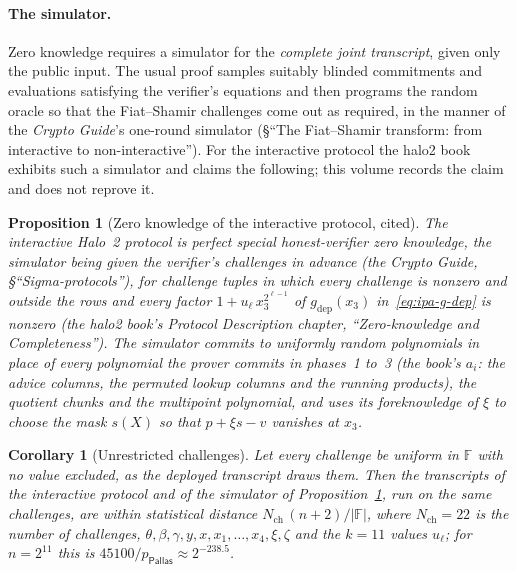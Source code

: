 \documentclass[11pt,a4paper]{article}
\newtheorem{proposition}[theorem]{Proposition}
\newtheorem{corollary}[theorem]{Corollary}
\theoremstyle{definition}
\newcommand{\F}{\mathbb{F}}
\newcommand{\Pallas}{\ensuremath{\mathsf{Pallas}}}
\begin{document}
\paragraph{The simulator.}
Zero knowledge requires a simulator for the \emph{complete joint
transcript}, given only the public input. The usual proof samples
suitably blinded commitments and evaluations satisfying the verifier's
equations and then programs the random oracle so that the Fiat--Shamir
challenges come out as required, in the manner of the \emph{Crypto
Guide}'s one-round simulator (\S``The Fiat--Shamir transform: from
interactive to non-interactive''). For the interactive protocol the
halo2 book exhibits such a simulator and claims the following; this
volume records the claim and does not reprove it.

\begin{proposition}[Zero knowledge of the interactive protocol, cited]
\label{prop:halo2-zk}
The interactive Halo~2 protocol is perfect special honest-verifier zero
knowledge, the simulator being given the verifier's challenges in
advance (the \emph{Crypto Guide}, \S``Sigma-protocols''), for challenge
tuples in which every challenge is nonzero and outside the rows and
every factor $1 + u_\ell\,x_3^{2^{\ell-1}}$ of $g_{\mathrm{dep}}(x_3)$
in~\eqref{eq:ipa-g-dep} is nonzero (the halo2 book's \emph{Protocol
Description} chapter, ``Zero-knowledge and Completeness''). The simulator
commits to uniformly random polynomials in place of every polynomial the
prover commits in phases~1 to~3 (the book's $a_i$: the advice columns,
the permuted lookup columns and the running products), the quotient
chunks and the multipoint polynomial, and uses its foreknowledge
of $\xi$ to choose the mask $s(X)$ so that $p + \xi s - v$ vanishes at
$x_3$.
\end{proposition}

\begin{corollary}[Unrestricted challenges]\label{cor:halo2-zk-deployed}
Let every challenge be uniform in $\F$ with no value excluded, as the
deployed transcript draws them. Then the transcripts of the interactive
protocol and of the simulator of Proposition~\ref{prop:halo2-zk}, run on
the same challenges, are within statistical distance
$N_{\mathrm{ch}}\,(n + 2)/|\F|$, where $N_{\mathrm{ch}} = 22$ is the
number of challenges, $\theta, \beta, \gamma, y, x, x_1, \dots, x_4,
\xi, \zeta$ and the $k = 11$ values $u_\ell$; for $n = 2^{11}$ this is
$45100/p_{\Pallas} \approx 2^{-238.5}$.
\end{corollary}
\end{document}
